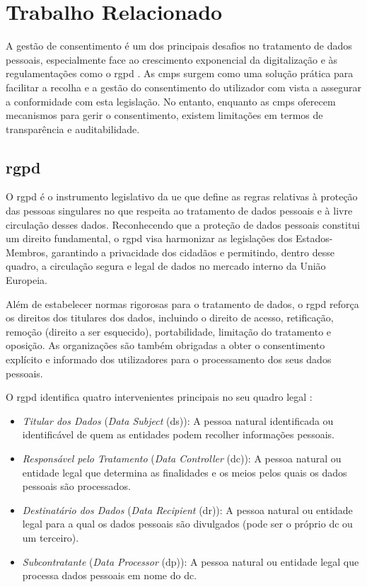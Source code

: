 \chapter{Trabalho Relacionado}
\label{cap:relacionado}

A gestão de consentimento é um dos principais desafios no tratamento de dados pessoais, especialmente face ao crescimento exponencial da digitalização e às regulamentações como o \acrshort{rgpd} \citep{gdpr}.
As \acrshort{cmp}s surgem como uma solução prática para facilitar a recolha e a gestão do consentimento do utilizador com vista a assegurar a conformidade com esta legislação. No entanto, enquanto as \acrshort{cmp}s oferecem mecanismos para gerir o consentimento, existem limitações em termos de transparência e auditabilidade.

\section{\acrfull{rgpd}}

O \acrshort{rgpd} é o instrumento legislativo da \acrfull{ue} que define as regras relativas à proteção das pessoas singulares no que respeita ao tratamento de dados pessoais e à livre circulação desses dados. Reconhecendo que a proteção de dados pessoais constitui um direito fundamental, o \acrshort{rgpd} visa harmonizar as legislações dos Estados-Membros, garantindo a privacidade dos cidadãos e permitindo, dentro desse quadro, a circulação segura e legal de dados no mercado interno da União Europeia.

Além de estabelecer normas rigorosas para o tratamento de dados, o \acrshort{rgpd} reforça os direitos dos titulares dos dados, incluindo o direito de acesso, retificação, remoção (direito a ser esquecido), portabilidade, limitação do tratamento e oposição. As organizações são também obrigadas a obter o consentimento explícito e informado dos utilizadores para o processamento dos seus dados pessoais. \citep{Daudén-Esmel2024}

O \acrshort{rgpd} identifica quatro intervenientes principais no seu quadro legal \citep{gdpr2016}:  
\begin{itemize}
    \item \textit{Titular dos Dados} (\textit{Data Subject} (\acrshort{ds})): A pessoa natural identificada ou identificável de quem as entidades podem recolher informações pessoais.  
    \item \textit{Responsável pelo Tratamento} (\textit{Data Controller} (\acrshort{dc})): A pessoa natural ou entidade legal que determina as finalidades e os meios pelos quais os dados pessoais são processados.  
    \item \textit{Destinatário dos Dados} (\textit{Data Recipient} (\acrshort{dr})): A pessoa natural ou entidade legal para a qual os dados pessoais são divulgados (pode ser o próprio \acrshort{dc} ou um terceiro).  
    \item \textit{Subcontratante} (\textit{Data Processor} (\acrshort{dp})): A pessoa natural ou entidade legal que processa dados pessoais em nome do \acrshort{dc}.
\end{itemize}

